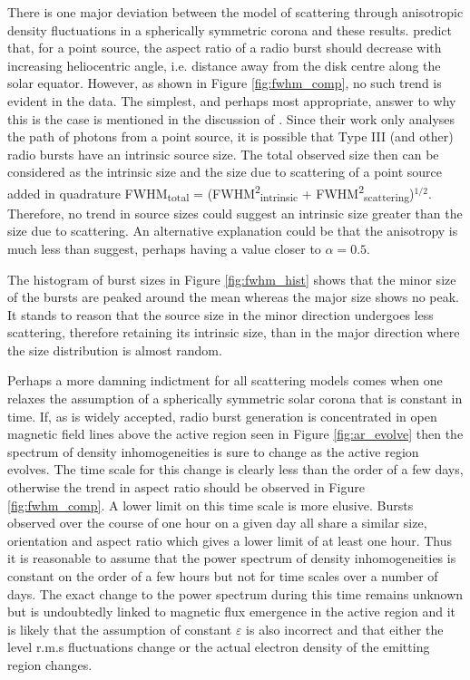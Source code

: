 There is one major deviation between the model of scattering through anisotropic density fluctuations in a spherically symmetric corona and these results. \cite{Kontar2019} predict that, for a point source, the aspect ratio of a radio burst should decrease with increasing heliocentric angle, i.e. distance away from the disk centre along the solar equator. However, as shown in Figure \ref{fig:fwhm_comp}, no such trend is evident in the data.  The simplest, and perhaps most appropriate, answer to why this is the case is mentioned in the discussion of \cite{Kontar2019}. Since their work only analyses the path of photons from a point source, it is possible that Type III (and other) radio bursts have an intrinsic source size. The total observed size then can be considered as the intrinsic size and the size due to scattering of a point source added in quadrature FWHM\textsubscript{total} = (FWHM\textsuperscript{2}\textsubscript{intrinsic} + FWHM\textsuperscript{2}\textsubscript{scattering})$^{1/2}$. Therefore, no trend in source sizes could suggest an intrinsic size greater than the size due to scattering. An alternative explanation could be that the anisotropy is much less than \cite{Kontar2019} suggest, perhaps having a value closer to $\alpha = 0.5$. 

The histogram of burst sizes in Figure \ref{fig:fwhm_hist} shows that the minor size of the bursts are peaked around the mean whereas the major size shows no peak. It stands to reason that the source size in the minor direction undergoes less scattering, therefore retaining its intrinsic size, than in the major direction where the size distribution is almost random.

Perhaps a more damning indictment for all scattering models comes when one relaxes the assumption of a spherically symmetric solar corona that is constant in time.  If, as is widely accepted, radio burst generation is concentrated in open magnetic field lines above the active region seen in Figure \ref{fig:ar_evolve} then the spectrum of density inhomogeneities is sure to change as the active region evolves. The time scale for this change is clearly less than the order of a few days, otherwise the trend in aspect ratio should be observed in Figure \ref{fig:fwhm_comp}. A lower limit on this time scale is more elusive. Bursts observed over the course of one hour on a given day all share a similar size, orientation and aspect ratio which gives a lower limit of at least one hour. Thus it is reasonable to assume that the power spectrum of density inhomogeneities is constant on the order of a few hours but not for time scales over a number of days. The exact change to the power spectrum during this time remains unknown but is undoubtedly linked to magnetic flux emergence in the active region and it is likely that the assumption of constant $\varepsilon$ is also incorrect and that either the level r.m.s fluctuations change or the actual electron density of the emitting region changes.

